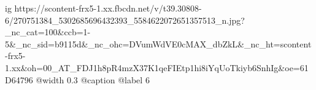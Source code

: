  
 
 
 
 

\ifcmt
  ig https://scontent-frx5-1.xx.fbcdn.net/v/t39.30808-6/270751384_5302685696432393_5584622072651357513_n.jpg?_nc_cat=100&ccb=1-5&_nc_sid=b9115d&_nc_ohc=DVumWdVE0cMAX_dbZkL&_nc_ht=scontent-frx5-1.xx&oh=00_AT_FDJ1h8pR4mzX37K1qeFIEtp1hi8iYqUoTkiyb6SnhIg&oe=61D64796
  @width 0.3
	@caption @label 6
\fi
